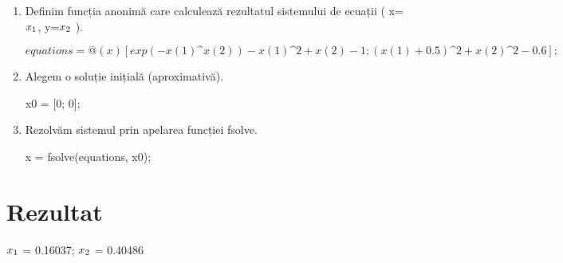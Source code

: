 \documentclass{article}
\begin{document}
\begin{center}
\begin{enumerate}
\item Definim funcția anonimă care calculează rezultatul sistemului de ecuații ( x=$x\textsubscript{1}$, y=$x\textsubscript{2}$ ). \\
 \begin{center}
    \[
    equations = @(x) [exp(-x(1)\^{}x(2)) - x(1)\^{}2 + x(2) - 1;
                  (x(1)+0.5)\^{}2+ x(2)\^{}2 - 0.6];
\] 
    \end{center}
\item  Alegem o soluție inițială (aproximativă). \\
\begin{center}
    x0 = [0; 0];
    \end{center}
\item Rezolvăm sistemul prin apelarea funcției fsolve. \\
\begin{center}
    x = fsolve(equations, x0);
    \end{center}
\end{enumerate}
\end{center}

\section*{Rezultat}
\begin{center}
   $x\textsubscript{1}$  = 0.16037; $x\textsubscript{2}$  = 0.40486
\end{center}
\end{document}
